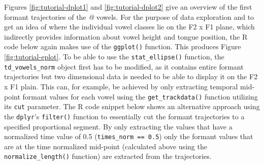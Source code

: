 \documentclass[]{book}
\theoremstyle{definition}
\theoremstyle{definition}
\theoremstyle{definition}
\theoremstyle{remark}
\begin{document}
Figures \ref{fig:tutorial-dplot1} and \ref{fig:tutorial-dplot2} give an
overview of the first formant trajectories of the \emph{@} vowels. For
the purpose of data exploration and to get an idea of where the
individual vowel classes lie on the F2 x F1 plane, which indirectly
provides information about vowel height and tongue position, the R code
below again makes use of the \texttt{ggplot()} function. This produces
Figure \ref{fig:tutorial-eplot}. To be able to use the
\texttt{stat\_ellipse()} function, the \texttt{td\_vowels\_norm} object
first has to be modified, as it contains entire formant trajectories but
two dimensional data is needed to be able to display it on the F2 x F1
plain. This can, for example, be achieved by only extracting temporal
mid-point formant values for each vowel using the
\texttt{get\_trackdata()} function utilizing its \texttt{cut} parameter.
The R code snippet below shows an alternative approach using the
\texttt{dplyr}'s \texttt{filter()} function to essentially cut the
formant trajectories to a specified proportional segment. By only
extracting the values that have a normalized time value of 0.5
(\texttt{times\_norm\ ==\ 0.5}) only the formant values that are at the
time normalized mid-point (calculated above using the
\texttt{normalize\_length()} function) are extracted from the
trajectories.
\end{document}
